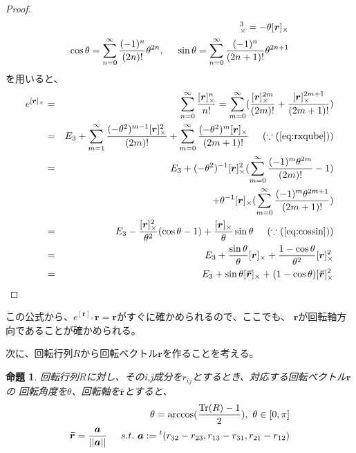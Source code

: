 \documentclass[10pt]{jarticle}
\newtheorem{Prp}{命題}[section]
\newcommand{\exprx}{e^{[\boldsymbol{r}]_{\times}}}
\newcommand{\rx}{[\boldsymbol{r}]_{\times}}
\begin{document}
\begin{proof}
    \begin{eqnarray}
        \rx^3 = -\theta \rx \label{eq:rxqube}\\
        \cos \theta = \sum_{n=0}^\infty \frac{(-1)^n}{(2n)!}\theta^{2n}, \hspace{5mm}
        \sin \theta = \sum_{n=0}^\infty \frac{(-1)^n}{(2n+1)!}\theta^{2n+1} \label{eq:cossin}
     \end{eqnarray}
     を用いると、
    \begin{eqnarray}
        \exprx 
        &=& \sum_{n=0}^\infty \frac{\rx^n}{n!}
        = \sum_{m=0}^{\infty} (\frac{\rx^{2m}}{(2m)!} + \frac{\rx^{2m+1}}{(2m+1)!}) \\
        &=& E_3 + \sum_{m=1}^\infty \frac{(-\theta^2)^{m-1} \rx^2}{(2m)!} 
        + \sum_{m=0}^\infty \frac{(-\theta^2)^m \rx}{(2m+1)!} \hspace{5mm} (\because (\ref{eq:rxqube}))\\
        &=& E_3 + (-\theta^2)^{-1} \rx^2 (\sum_{m=0}^\infty \frac{(-1)^m\theta^{2m}}{(2m)!} - 1) \nonumber\\
        && + \theta^{-1} \rx (\sum_{m=0}^\infty \frac{(-1)^m\theta^{2m+1}}{(2m+1)!} ) \\
        &=& E_3 - \frac{\rx^2}{\theta^2}(\cos\theta - 1) + \frac{\rx}{\theta} \sin\theta 
        \hspace{5mm}(\because(\ref{eq:cossin}))\\
        &=& E_3 + \frac{\sin \theta}{\theta}\rx
        + \frac{1-\cos \theta}{\theta^2}\rx^2\\
        &=& E_3 + \sin\theta [\boldsymbol{\bar r}]_{\times} + (1-\cos \theta)[\boldsymbol{\bar r}]_{\times}^2
    \end{eqnarray}
\end{proof}

この公式から、$e^{[\boldsymbol{r}]_{\times }} \boldsymbol{r} = \boldsymbol{r}$がすぐに確かめられるので、ここでも、
$\boldsymbol{r}$が回転軸方向であることが確かめられる。


次に、回転行列$R$から回転ベクトル$\boldsymbol{r}$を作ることを考える。
\begin{Prp}
    回転行列$R$に対し、そのi,j成分を$r_{ij}$とするとき、対応する回転ベクトル$\boldsymbol{r}$の
    回転角度を$\theta$、回転軸を$\boldsymbol{\bar{r}}$とすると、
    \begin{eqnarray}
        \theta = \arccos(\frac{\mathrm{Tr}(R)-1}{2}),\ \theta \in [0,\pi] \\
        \boldsymbol{\bar{r}} = \frac{\boldsymbol{a}}{||\boldsymbol{a}||}
        \hspace{5mm}s.t.\  \boldsymbol{a} := {}^t(r_{32}-r_{23},r_{13}-r_{31},r_{21}-r_{12}) 
    \end{eqnarray}
\end{Prp}
\end{document}
